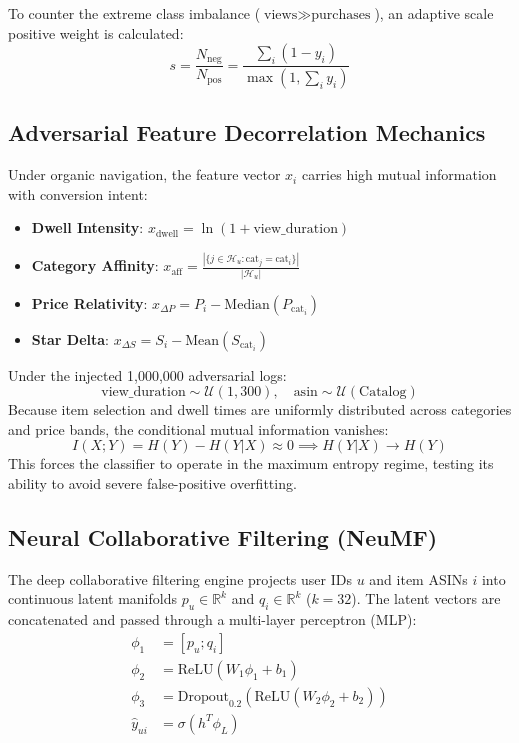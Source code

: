 \documentclass[11pt,a4paper]{article}
\begin{document}
To counter the extreme class imbalance ($\text{views} \gg \text{purchases}$), an adaptive scale positive weight is calculated:
\begin{equation}
    s = \frac{N_{\text{neg}}}{N_{\text{pos}}} = \frac{\sum_i (1 - y_i)}{\max\left(1, \sum_i y_i\right)}
\end{equation}

\subsection{Adversarial Feature Decorrelation Mechanics}
Under organic navigation, the feature vector $x_i$ carries high mutual information with conversion intent:
\begin{itemize}
    \item \textbf{Dwell Intensity}: $x_{\text{dwell}} = \ln(1 + \text{view\_duration})$
    \item \textbf{Category Affinity}: $x_{\text{aff}} = \frac{|\{j \in \mathcal{H}_u : \text{cat}_j = \text{cat}_i\}|}{|\mathcal{H}_u|}$
    \item \textbf{Price Relativity}: $x_{\Delta P} = P_i - \text{Median}(P_{\text{cat}_i})$
    \item \textbf{Star Delta}: $x_{\Delta S} = S_i - \text{Mean}(S_{\text{cat}_i})$
\end{itemize}

Under the injected 1,000,000 adversarial logs:
\begin{equation}
    \text{view\_duration} \sim \mathcal{U}(1, 300), \quad \text{asin} \sim \mathcal{U}(\text{Catalog})
\end{equation}
Because item selection and dwell times are uniformly distributed across categories and price bands, the conditional mutual information vanishes:
\begin{equation}
    I(X; Y) = H(Y) - H(Y|X) \approx 0 \implies H(Y|X) \to H(Y)
\end{equation}
This forces the classifier to operate in the maximum entropy regime, testing its ability to avoid severe false-positive overfitting.

\subsection{Neural Collaborative Filtering (NeuMF)}
The deep collaborative filtering engine projects user IDs $u$ and item ASINs $i$ into continuous latent manifolds $p_u \in \mathbb{R}^k$ and $q_i \in \mathbb{R}^k$ ($k=32$). The latent vectors are concatenated and passed through a multi-layer perceptron (MLP):
\begin{align}
    \phi_1 &= [p_u; q_i] \\
    \phi_2 &= \text{ReLU}(W_1 \phi_1 + b_1) \\
    \phi_3 &= \text{Dropout}_{0.2}(\text{ReLU}(W_2 \phi_2 + b_2)) \\
    \hat{y}_{ui} &= \sigma(h^T \phi_L)
\end{align}
\end{document}
